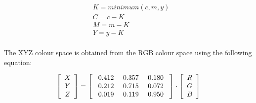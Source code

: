 \begin{equation}\label{cmyk}
\begin{split}
&K = minimum (c, m, y)\\
&C = c - K\\
&M = m - K\\
&Y = y - K\\
\end{split}
\end{equation}

The XYZ colour space is obtained from the RGB colour space using the following equation:

\begin{equation}
\left [ { \begin{array}{c} X  \\ Y   \\ Z \end{array} } \right ] = 
\left [ { \begin{array}{c c c} \mbox{ 0.412}  & \mbox{ 0.357} &  \mbox{ 0.180 } \\ \mbox{ 0.212} & \mbox{ 0.715} & \mbox{ 0.072 } \\ \mbox{ 0.019} & \mbox{ 0.119} & \mbox{ 0.950 }  \end{array} } \right ] \cdot \left [ { \begin{array}{c} R  \\ G  \\ B     \end{array} } \right ] 
\end{equation}


